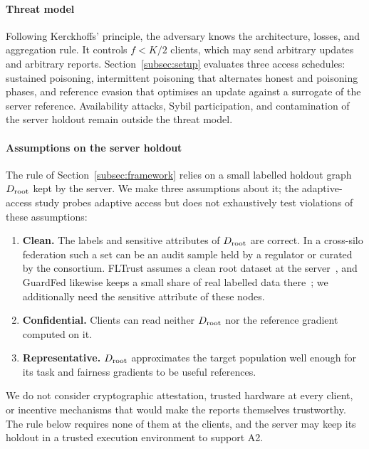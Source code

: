 \paragraph{Threat model}
Following Kerckhoffs' principle, the adversary knows the architecture, losses, and aggregation rule. It controls $f < K/2$ clients, which may send arbitrary updates and arbitrary reports. Section~\ref{subsec:setup} evaluates three access schedules: sustained poisoning, intermittent poisoning that alternates honest and poisoning phases, and reference evasion that optimises an update against a surrogate of the server reference. Availability attacks, Sybil participation, and contamination of the server holdout remain outside the threat model.

\paragraph{Assumptions on the server holdout}
The rule of Section~\ref{subsec:framework} relies on a small labelled holdout graph $D_{\mathrm{root}}$ kept by the server. We make three assumptions about it; the adaptive-access study probes adaptive access but does not exhaustively test violations of these assumptions:
\begin{enumerate}[leftmargin=*, label=\textbf{A\arabic*}]
    \item \textbf{Clean.} The labels and sensitive attributes of $D_{\mathrm{root}}$ are correct. In a cross-silo federation such a set can be an audit sample held by a regulator or curated by the consortium. FLTrust assumes a clean root dataset at the server~\citep{cao2021fltrust}, and GuardFed likewise keeps a small share of real labelled data there~\citep{li2025guardfed}; we additionally need the sensitive attribute of these nodes.
    \item \textbf{Confidential.} Clients can read neither $D_{\mathrm{root}}$ nor the reference gradient computed on it.
    \item \textbf{Representative.} $D_{\mathrm{root}}$ approximates the target population well enough for its task and fairness gradients to be useful references.
\end{enumerate}
We do not consider cryptographic attestation, trusted hardware at every client, or incentive mechanisms that would make the reports themselves trustworthy. The rule below requires none of them at the clients, and the server may keep its holdout in a trusted execution environment to support A2.

